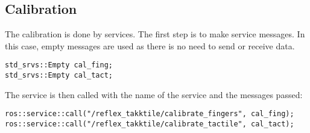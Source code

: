 \documentclass[11pt,a4paper]{report}
\begin{document}
\subsection{Calibration} \label{CalibratingHand}
The calibration is done by services. The first step is to make service messages. In this case, empty messages are used as there is no need to send or receive data.
\begin{verbatim}
std_srvs::Empty cal_fing;
std_srvs::Empty cal_tact;
\end{verbatim}
The service is then called with the name of the service and the messages passed:
\begin{verbatim}
ros::service::call("/reflex_takktile/calibrate_fingers", cal_fing);
ros::service::call("/reflex_takktile/calibrate_tactile", cal_tact);
\end{verbatim}
\end{document}
